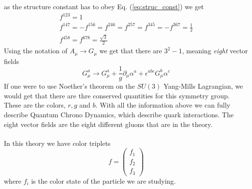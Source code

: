 \documentclass[12pt, a4paper]{book}
\begin{document}
as the structure constant has to obey Eq. (\ref{eq:struc_const}) we get 
\begin{align*}
    f^{123}=1\\
    f^{147}=-f^{156}=f^{246}=f^{257}=f^{345}=-f^{367}={\frac{1}{2}}\\
    f^{458}=f^{678}={\frac {\sqrt {3}}{2}}
\end{align*}
Using the notation of $A_\mu\rightarrow G_\mu$ we get that there are $3^2-1$, meaning \textit{eight} vector fields 
$$
G_\mu^a \rightarrow G^a_\mu +\frac{1}{g}\partial_\mu\alpha^a +\epsilon^{abc}G_\mu^b\alpha^c
$$
If one were to use Noether's theorem on the $SU(3)$ Yang-Mills Lagrangian, we would get that there are thre conserved quantities for this symmetry group. These are the colors, $r,g$ and $b$. With all the information above we can 
fully describe Quantum Chrono Dynamics, which describe quark interactions. The eight vector fields are the eight different gluons that are in the theory.\\
\\In this theory we have color triplets
$$
f=\begin{pmatrix}
    f_1\\f_2\\f_3
\end{pmatrix}
$$
where $f_i$ is the color state of the particle we are studying.
\end{document}

